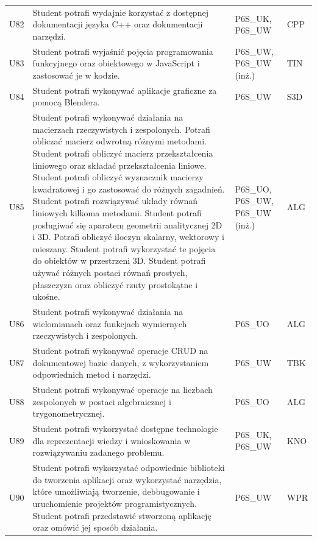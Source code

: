 \documentclass[12pt,a4paper]{article}
\begin{document}
{\begin{longtable}{m{1cm}m{8.8cm}m{2.1cm}m{2.5cm}}
\rowcolor{tableRowAlt} U82 & Student potrafi wydajnie korzystać z dostępnej dokumentacji języka C++ oraz dokumentacji narzędzi. & {\scriptsize P6S\_UK, P6S\_UW} & {\scriptsize CPP} \\
\rowcolor{tableRowLight} U83 & Student potrafi wyjaśnić pojęcia programowania funkcyjnego oraz obiektowego w JavaScript i zastosować je w kodzie. & {\scriptsize P6S\_UW, P6S\_UW {\scriptsize (inż.)}} & {\scriptsize TIN} \\
\rowcolor{tableRowAlt} U84 & Student potrafi wykonywać aplikacje graficzne za pomocą Blendera. & {\scriptsize P6S\_UW} & {\scriptsize S3D} \\
\rowcolor{tableRowLight} U85 & Student potrafi wykonywać działania na macierzach rzeczywistych i zespolonych. Potrafi obliczać macierz odwrotną różnymi metodami. Student potrafi obliczyć macierz przekształcenia liniowego oraz składać przekształcenia liniowe. Student potrafi obliczyć wyznacznik macierzy kwadratowej i go zastosować do różnych zagadnień. Student potrafi rozwiązywać układy równań liniowych kilkoma metodami. Student potrafi posługiwać się aparatem geometrii analitycznej 2D i 3D. Potrafi obliczyć iloczyn skalarny, wektorowy i mieszany. Student potrafi wykorzystać te pojęcia do obiektów w przestrzeni 3D. Student potrafi używać różnych postaci równań prostych, płaszczyzn oraz obliczyć rzuty prostokątne i ukośne. & {\scriptsize P6S\_UO, P6S\_UW, P6S\_UW {\scriptsize (inż.)}} & {\scriptsize ALG} \\
\rowcolor{tableRowAlt} U86 & Student potrafi wykonywać działania na wielomianach oraz funkcjach wymiernych rzeczywistych i zespolonych. & {\scriptsize P6S\_UO} & {\scriptsize ALG} \\
\rowcolor{tableRowLight} U87 & Student potrafi wykonywać operacje CRUD na dokumentowej bazie danych, z wykorzystaniem odpowiednich metod i narzędzi. & {\scriptsize P6S\_UW} & {\scriptsize TBK} \\
\rowcolor{tableRowAlt} U88 & Student potrafi wykonywać operacje na liczbach zespolonych w postaci algebraicznej i trygonometrycznej. & {\scriptsize P6S\_UO} & {\scriptsize ALG} \\
\rowcolor{tableRowLight} U89 & Student potrafi wykorzystać dostępne technologie dla reprezentacji wiedzy i wnioskowania w rozwiązywaniu zadanego problemu. & {\scriptsize P6S\_UK, P6S\_UW} & {\scriptsize KNO} \\
\rowcolor{tableRowAlt} U90 & Student potrafi wykorzystać odpowiednie biblioteki do tworzenia aplikacji oraz wykorzystać narzędzia, które umożliwiają tworzenie, debbugowanie i uruchomienie projektów programistycznych. Student potrafi przedstawić stworzoną aplikację oraz omówić jej sposób działania. & {\scriptsize P6S\_UW} & {\scriptsize WPR} \\

\end{longtable}}
\end{document}

